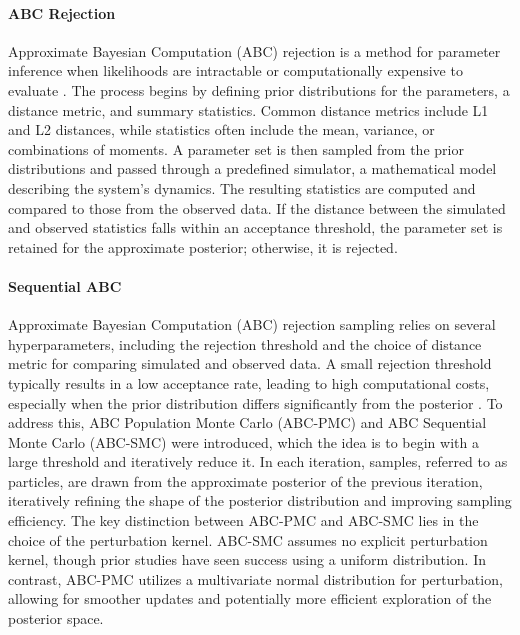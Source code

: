 \documentclass[12pt]{article} %
\newcommand{\para}[1]{\vspace*{-4.5mm}\paragraph{#1}}
\begin{document}
\para{ABC Rejection}
Approximate Bayesian Computation (ABC) rejection is a method for parameter inference when likelihoods are intractable or computationally expensive to evaluate \citep{tavare1997inferring}. The process begins by defining prior distributions for the parameters, a distance metric, and summary statistics. Common distance metrics include L1 and L2 distances, while statistics often include the mean, variance, or combinations of moments. A parameter set is then sampled from the prior distributions and passed through a predefined simulator, a mathematical model describing the system's dynamics. The resulting statistics are computed and compared to those from the observed data. If the distance between the simulated and observed statistics falls within an acceptance threshold, the parameter set is retained for the approximate posterior; otherwise, it is rejected.

\para{Sequential ABC}
Approximate Bayesian Computation (ABC) rejection sampling relies on several hyperparameters, including the rejection threshold and the choice of distance metric for comparing simulated and observed data. A small rejection threshold typically results in a low acceptance rate, leading to high computational costs, especially when the prior distribution differs significantly from the posterior \citep{toni2009approximate}. To address this, ABC Population Monte Carlo (ABC-PMC) and ABC Sequential Monte Carlo (ABC-SMC) were introduced, which the idea is to begin with a large threshold and iteratively reduce it. In each iteration, samples, referred to as particles, are drawn from the approximate posterior of the previous iteration, iteratively refining the shape of the posterior distribution and improving sampling efficiency. The key distinction between ABC-PMC and ABC-SMC lies in the choice of the perturbation kernel. ABC-SMC assumes no explicit perturbation kernel, though prior studies have seen success using a uniform distribution. In contrast, ABC-PMC utilizes a multivariate normal distribution for perturbation, allowing for smoother updates and potentially more efficient exploration of the posterior space.

\end{document}
